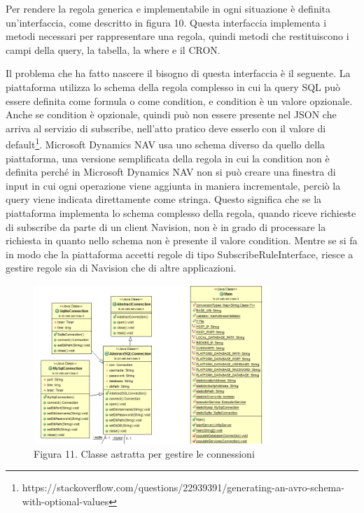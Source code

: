 Per rendere la regola generica e implementabile in ogni situazione è  definita un’interfaccia, come descritto in figura 10. Questa interfaccia implementa i metodi necessari per rappresentare una regola, quindi metodi che restituiscono i campi della query, la tabella, la where e il CRON.

Il problema che ha fatto nascere il bisogno di questa interfaccia è il seguente. La piattaforma utilizza lo schema della regola complesso in cui la query SQL può essere definita come formula o come condition, e condition è un valore opzionale. Anche se condition è opzionale, quindi può non essere presente nel JSON che arriva al servizio di subscribe, nell’atto pratico deve esserlo con il valore di default\footnote{https://stackoverflow.com/questions/22939391/generating-an-avro-schema-with-optional-values}. Microsoft Dynamics NAV usa uno schema diverso da quello della piattaforma, una versione semplificata della regola in cui la condition non è definita perché in Microsoft Dynamics NAV non si può creare una finestra di input in cui ogni operazione viene aggiunta in maniera incrementale, perciò la query viene indicata direttamente come stringa. Questo significa che se la piattaforma implementa lo schema complesso della regola, quando riceve richieste di subscribe da parte di un client Navision, non è in grado di processare la richiesta in quanto nello schema non è presente il valore condition. Mentre se si fa in modo che la piattaforma accetti regole di tipo SubscribeRuleInterface, riesce a gestire regole sia di Navision che di altre applicazioni.
\clearpage
\begin{figure}[h]
	\centering
	\includegraphics[width=0.8\textwidth]{main.png}
	\caption*{Figura 11. Classe astratta per gestire le connessioni}
\end{figure}

